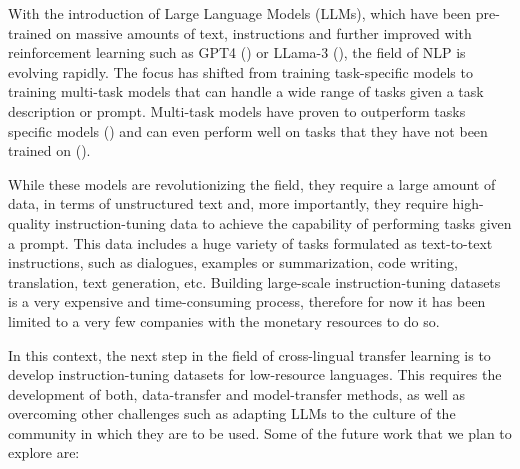 With the introduction of Large Language Models (LLMs), which have been pre-trained on massive amounts of text, instructions and further improved with reinforcement learning such as GPT4 (\cite{openai2024gpt4technicalreport}) or LLama-3 (\cite{llama3modelcard}), the field of NLP is evolving rapidly. The focus has shifted from training task-specific models to training multi-task models that can handle a wide range of tasks given a task description or prompt. Multi-task models have proven to outperform tasks specific models (\cite{DBLP:journals/corr/abs-2108-03265}) and can even perform well on tasks that they have not been trained on (\cite{brown2020language}). 

While these models are revolutionizing the field, they require a large amount of data, in terms of unstructured text and, more importantly, they require high-quality instruction-tuning data to achieve the capability of performing tasks given a prompt. This data includes a huge variety of tasks formulated as text-to-text instructions, such as dialogues, examples or summarization, code writing, translation, text generation, etc. Building large-scale instruction-tuning datasets is a very expensive and time-consuming process, therefore for now it has been limited to a very few companies with the monetary resources to do so. 

In this context, the next step in the field of cross-lingual transfer learning is to develop instruction-tuning datasets for low-resource languages. This requires the development of both, data-transfer and model-transfer methods, as well as overcoming other challenges such as adapting LLMs to the culture of the community in which they are to be used. Some of the future work that we plan to explore are:

